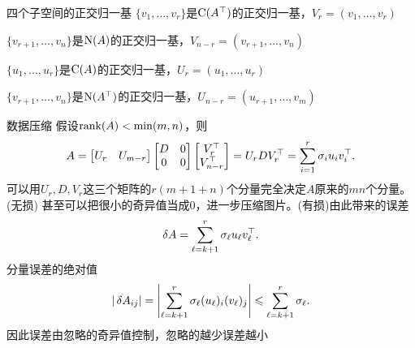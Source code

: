 \begin{example}{四个子空间的正交归一基}{}
	$\{v_1,\ldots,v_r\}$是$\operatorname{C}(A^\top)$的正交归一基，$V_r=(v_1,\ldots,v_r)$

	$\{v_{r+1},\ldots,v_n\}$是$\operatorname{N}(A)$的正交归一基，$V_{n-r}=(v_{r+1},\ldots,v_n)$

	$\{u_1,\ldots,u_r\}$是$\operatorname{C}(A)$的正交归一基，$U_r=(u_1,\ldots,u_r)$

	$\{v_{r+1},\ldots,v_n\}$是$\operatorname{N}(A^\top)$的正交归一基，$U_{n-r}=(u_{r+1},\ldots,v_m)$
\end{example}
\begin{example}{数据压缩}{}
	假设$\operatorname{rank}(A)<\min(m,n)$，则 
	\[
		A=\begin{bmatrix}
			U_r&U_{m-r}
		\end{bmatrix}\begin{bmatrix}
			D&0\\0&0
		\end{bmatrix}\begin{bmatrix}
			V_r^\top\\V_{n-r}^\top
		\end{bmatrix}=U_rDV_r^\top=\sum_{i=1}^r\sigma_iu_iv_i^\top.
	\]
	可以用$U_r,D,V_r$这三个矩阵的$r(m+1+n)$个分量完全决定$A$原来的$mn$个分量。(无损)
	\tcblower
	甚至可以把很小的奇异值当成0，进一步压缩图片。(有损)由此带来的误差
	\[
		\mathop{}\!\delta A=\sum_{\ell=k+1}^r\sigma_\ell u_\ell v_\ell^\top.
	\]
	分量误差的绝对值
	\[
		|\mathop{}\!\delta A_{ij}|=\left\lvert\sum_{\ell=k+1}^r\sigma_\ell (u_\ell)_i (v_\ell)_j\right\rvert\leqslant\sum_{\ell=k+1}^r\sigma_\ell.
	\]
	因此误差由忽略的奇异值控制，忽略的越少误差越小
\end{example}

